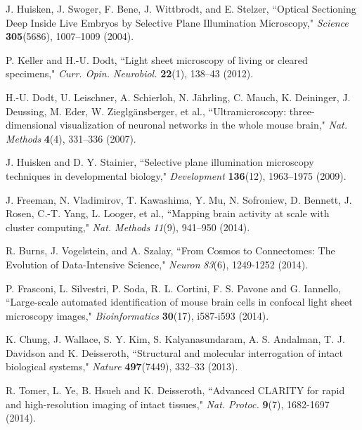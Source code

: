 \documentclass[12pt]{spieman}  %
\begin{document}
\begin{spacing}{2}

\begin{thebibliography}{0}

 J. Huisken, J. Swoger, F. Bene, J. Wittbrodt, and E. Stelzer, ``Optical Sectioning Deep Inside Live Embryos by Selective Plane Illumination Microscopy," \emph{Science} \textbf{305}(5686), 1007–1009 (2004). 

 P. Keller and H.-U. Dodt, ``Light sheet microscopy of living or cleared specimens," \emph{Curr. Opin. Neurobiol.} \textbf{22}(1), 138–43 (2012). 

 H.-U. Dodt, U. Leischner, A. Schierloh, N. J\"{a}hrling, C. Mauch, K. Deininger, J. Deussing, M. Eder, W. Zieglg\"{a}nsberger, et al., ``Ultramicroscopy: three-dimensional visualization of neuronal networks in the whole mouse brain," \emph{Nat. Methods} \textbf{4}(4), 331–336 (2007). 

 J. Huisken and D. Y. Stainier, ``Selective plane illumination microscopy techniques in developmental biology," \emph{Development} \textbf{136}(12), 1963–1975 (2009).

 J. Freeman, N. Vladimirov, T. Kawashima, Y. Mu, N. Sofroniew, D. Bennett, J. Rosen, C.-T. Yang, L. Looger, et al., ``Mapping brain activity at scale with cluster computing," \emph{Nat. Methods} \emph{11}(9), 941–950 (2014).

 R. Burns, J. Vogelstein, and A. Szalay, ``From Cosmos to Connectomes: The Evolution of Data-Intensive Science," \emph{Neuron} \emph{83}(6), 1249-1252 (2014).

 P. Frasconi, L. Silvestri, P. Soda, R. L. Cortini, F. S. Pavone and G. Iannello, ``Large-scale automated identification of mouse brain cells in confocal light sheet microscopy images," \emph{Bioinformatics} \textbf{30}(17), i587-i593 (2014).

 K. Chung, J. Wallace, S. Y. Kim, S. Kalyanasundaram, A. S. Andalman, T. J. Davidson and K. Deisseroth, ``Structural and molecular interrogation of intact biological systems," \emph{Nature} \textbf{497}(7449), 332–33 (2013).

 R. Tomer, L. Ye, B. Hsueh and K. Deisseroth, ``Advanced CLARITY for rapid and high-resolution imaging of intact tissues," \emph{Nat. Protoc.} \textbf{9}(7), 1682-1697 (2014).


\end{thebibliography}
\end{spacing}
\end{document}
